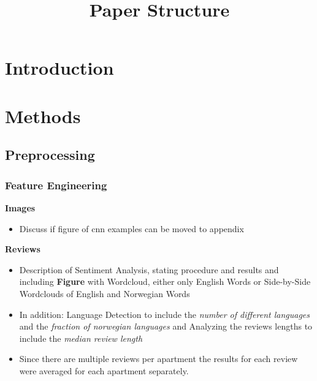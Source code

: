 \documentclass[12pt, letterpaper]{article}
\title{Paper Structure}
\author{}
\date{}
\begin{document}
\maketitle
\tableofcontents
\setcounter{tocdepth}{3}

\section{Introduction} %


\section{Methods} %


\subsection{Preprocessing} %

\subsubsection{Feature Engineering} %

\textbf{Images} %

\begin{itemize}
    \item Discuss if figure of cnn examples can be moved to appendix
\end{itemize}

\textbf{Reviews} %
\begin{itemize}
    \item Description of Sentiment Analysis, stating procedure and results and including \textbf{Figure} with Wordcloud, either only English Words or Side-by-Side Wordclouds of English and Norwegian Words
    \item In addition: Language Detection to include the \emph{number of different languages} and the \emph{fraction of norwegian languages} and Analyzing the reviews lengths to include the \emph{median review length}
    \item Since there are multiple reviews per apartment the results for each review were averaged for each apartment separately.
\end{itemize}
\end{document}
